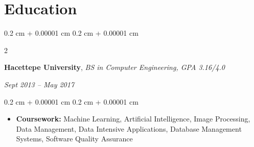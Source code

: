 \documentclass[10pt, letterpaper]{article}
\newenvironment{highlights}{
    \begin{itemize}[
        topsep=0.10 cm,
        parsep=0.10 cm,
        partopsep=0pt,
        itemsep=0pt,
        leftmargin=0.4 cm + 10pt
    ]
}{
    \end{itemize}
} %
\newenvironment{onecolentry}{
    \begin{adjustwidth}{
        0.2 cm + 0.00001 cm
    }{
        0.2 cm + 0.00001 cm
    }
}{
    \end{adjustwidth}
} %
\newenvironment{twocolentry}[2][]{
    \onecolentry
    \def\secondColumn{#2}
    \setcolumnwidth{\fill, 4.5 cm}
    \begin{paracol}{2}
}{
    \switchcolumn \raggedleft \secondColumn
    \end{paracol}
    \endonecolentry
} %
\begin{document}
    \section{Education}



        
        \begin{twocolentry}{
        \textit{Sept 2013 – May 2017}}
            \textbf{Hacettepe University}, \textit{BS in Computer Engineering, GPA 3.16/4.0}
        \end{twocolentry}

        \vspace{0.10 cm}
        \begin{onecolentry}
            \begin{highlights}
                \item \textbf{Coursework:} Machine Learning, Artificial Intelligence, Image Processing, Data Management, Data Intensive Applications, Database Management Systems, Software Quality Assurance
            \end{highlights}
        \end{onecolentry}



    
\end{document}
